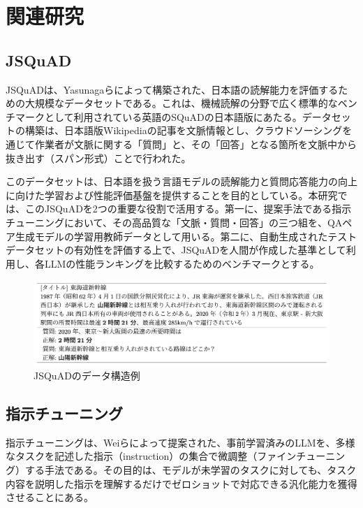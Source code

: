 \documentclass[twocolumn]{jsarticle}
\begin{document}
\section{関連研究}

\subsection{JSQuAD}
JSQuADは、Yasunagaらによって構築された\cite{JSQuAD}、日本語の読解能力を評価するための大規模なデータセットである。これは、機械読解の分野で広く標準的なベンチマークとして利用されている英語のSQuAD\cite{SQuAD}の日本語版にあたる。データセットの構築は、日本語版Wikipediaの記事を文脈情報とし、クラウドソーシングを通じて作業者が文脈に関する「質問」と、その「回答」となる箇所を文脈中から抜き出す（スパン形式）ことで行われた。

このデータセットは、日本語を扱う言語モデルの読解能力と質問応答能力の向上に向けた学習および性能評価基盤を提供することを目的としている。本研究では、このJSQuADを2つの重要な役割で活用する。第一に、提案手法である指示チューニングにおいて、その高品質な「文脈・質問・回答」の三つ組を、QAペア生成モデルの学習用教師データとして用いる。第二に、自動生成されたテストデータセットの有効性を評価する上で、JSQuADを人間が作成した基準として利用し、各LLMの性能ランキングを比較するためのベンチマークとする。

\begin{figure}[t]
  \centering
  \includegraphics[width=\linewidth]{fig/jsquad.png}
  \caption{JSQuADのデータ構造例\cite{JGLUE}}
  \label{fig:jsquad_example}
\end{figure}

\subsection{指示チューニング}
指示チューニングは、Weiらによって提案された\cite{Instruction-Tuning}、事前学習済みのLLMを、多様なタスクを記述した指示（instruction）の集合で微調整（ファインチューニング）する手法である。その目的は、モデルが未学習のタスクに対しても、タスク内容を説明した指示を理解するだけでゼロショットで対応できる汎化能力を獲得させることにある。
\end{document}
